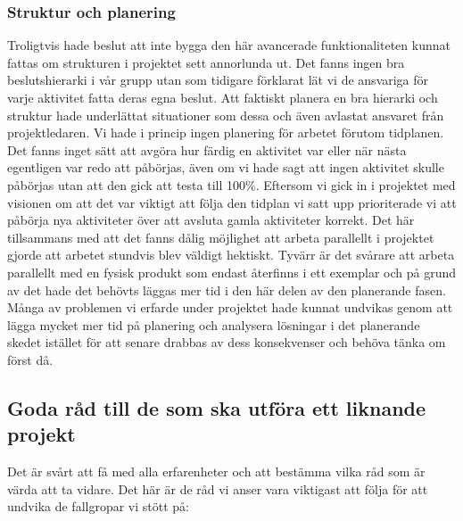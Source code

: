 \documentclass{article}
\begin{document}
\subsubsection{Struktur och planering}
Troligtvis hade beslut att inte bygga den här avancerade funktionaliteten kunnat fattas om strukturen i projektet sett annorlunda ut. Det fanns ingen bra beslutshierarki i vår grupp utan som tidigare förklarat lät vi de ansvariga för varje aktivitet fatta deras egna beslut. Att faktiskt planera en bra hierarki och struktur hade underlättat situationer som dessa och även avlastat ansvaret från projektledaren.
\newline\newline
Vi hade i princip ingen planering för arbetet förutom tidplanen. Det fanns inget sätt att avgöra hur färdig en aktivitet var eller när nästa egentligen var redo att påbörjas, även om vi hade sagt att ingen aktivitet skulle påbörjas utan att den gick att testa till 100\%. Eftersom vi gick in i projektet med visionen om att det var viktigt att följa den tidplan vi satt upp prioriterade vi att påbörja nya aktiviteter över att avsluta gamla aktiviteter korrekt. Det här tillsammans med att det fanns dålig möjlighet att arbeta parallellt i projektet gjorde att arbetet stundvis blev väldigt hektiskt. Tyvärr är det svårare att arbeta parallellt med en fysisk produkt som endast återfinns i ett exemplar och på grund av det hade det behövts läggas mer tid i den här delen av den planerande fasen. Många av problemen vi erfarde under projektet hade kunnat undvikas genom att lägga mycket mer tid på planering och analysera lösningar i det planerande skedet istället för att senare drabbas av dess konsekvenser och behöva tänka om först då.

\subsection{Goda råd till de som ska utföra ett liknande projekt}
Det är svårt att få med alla erfarenheter och att bestämma vilka råd som är värda att ta vidare. Det här är de råd vi anser vara viktigast att följa för att undvika de fallgropar vi stött på:
\end{document}

